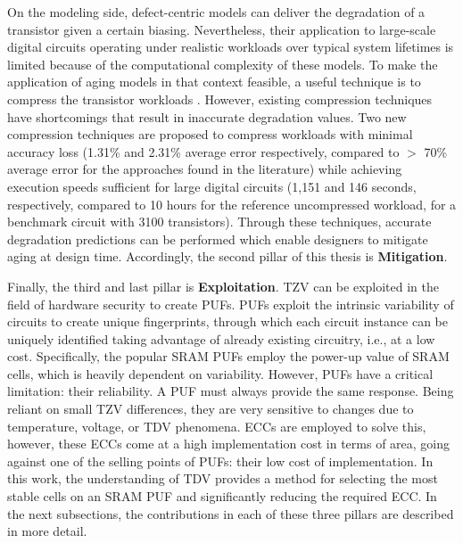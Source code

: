 On the modeling side, defect-centric models can deliver the degradation of a transistor given a certain biasing. Nevertheless, their application to large-scale digital circuits operating under realistic workloads over typical system lifetimes is limited because of the computational complexity of these models. To make the application of aging models in that context feasible, a useful technique is to compress the transistor workloads \cite{vansantenDesigningGuardbandsInstantaneous2016,AtomisticPseudoRodopoulos2014, duchAnalysisFunctionalErrors2020}. However, existing compression techniques have shortcomings that result in inaccurate degradation values. Two new compression techniques are proposed to compress workloads with minimal accuracy loss (1.31\% and 2.31\% average error respectively, compared to $>$ 70\% average error for the approaches found in the literature) while achieving execution speeds sufficient for large digital circuits (1,151 and 146 seconds, respectively, compared to 10 hours for the reference uncompressed workload, for a benchmark circuit with 3100 transistors). Through these techniques, accurate degradation predictions can be performed which enable designers to mitigate aging at design time. Accordingly, the second pillar of this thesis is \textbf{Mitigation}.

Finally, the third and last pillar is \textbf{Exploitation}. \gls{TZV} can be exploited in the field of hardware security to create \glspl{PUF}. \glspl{PUF} exploit the intrinsic variability of circuits to create unique fingerprints, through which each circuit instance can be uniquely identified taking advantage of already existing circuitry, i.e., at a low cost. Specifically, the popular \gls{SRAM} \glspl{PUF} \cite{saraza-canflancaImprovingReliabilitySRAMbased2021, santana-andreoDRVbasedBitSelection2022, santana-andreoReliabilityImprovementSRAM2024a} employ the power-up value of \gls{SRAM} cells, which is heavily dependent on variability. However, \glspl{PUF} have a critical limitation: their reliability. A \gls{PUF} must always provide the same response. Being reliant on small \gls{TZV} differences, they are very sensitive to changes due to temperature, voltage, or \gls{TDV} phenomena. \glspl{ECC} are employed to solve this, however, these \glspl{ECC} come at a high implementation cost in terms of area, going against one of the selling points of \glspl{PUF}: their low cost of implementation. In this work, the understanding of \gls{TDV} provides a method for selecting the most stable cells on an \gls{SRAM} \gls{PUF} and significantly reducing the required \gls{ECC}. In the next subsections, the contributions in each of these three pillars are described in more detail. 


